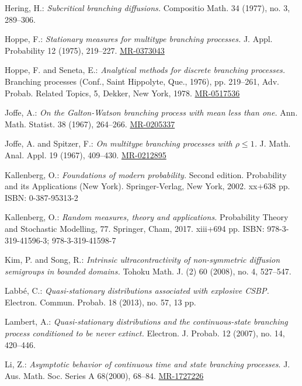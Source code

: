\documentclass[12pt,a4paper]{amsart}
\numberwithin{equation}{section}
\theoremstyle{plain}
\theoremstyle{definition}
\theoremstyle{remark}
\def\MR#1{\href{http://www.ams.org/mathscinet-getitem?mr=#1}{MR-#1}}
\begin{document}
\begin{thebibliography}{99}
	Hering, H.:
	\emph{Subcritical branching diffusions.}
	Compositio Math. 34 (1977), no. 3,
	289--306.
	
	Hoppe, F.:
	\emph{Stationary measures for multitype branching processes.}
	J. Appl. Probability 12 (1975), 219--227.
	\MR{0373043}
	
Hoppe, F. and Seneta, E.:
	\emph{Analytical methods for discrete branching processes.}
	Branching processes (Conf., Saint Hippolyte, Que., 1976), pp. 219--261,
	Adv. Probab. Related Topics, 5, Dekker, New York, 1978.
	\MR{0517536}
	
	Joffe, A.:
	\emph{On the Galton-Watson branching process with mean less than one.}
	Ann. Math. Statist. 38 (1967), 264--266.
	\MR{0205337}
	
Joffe, A. and Spitzer, F.:
	\emph{On multitype branching processes with $\rho \leq 1$.}
	J. Math. Anal. Appl. 19 (1967), 409--430.
	\MR{0212895}
	
	Kallenberg, O.:
	\emph{Foundations of modern probability.}
	Second edition. Probability and its Applications (New York). Springer-Verlag, New York, 2002. xx+638 pp. ISBN: 0-387-95313-2
	
	Kallenberg, O.:
	\emph{Random measures, theory and applications.}
	Probability Theory and Stochastic Modelling, 77. Springer, Cham, 2017. xiii+694 pp. ISBN: 978-3-319-41596-3; 978-3-319-41598-7
	
Kim, P. and Song, R.:
	\emph{Intrinsic ultracontractivity of non-symmetric diffusion semigroups in bounded domains.}
	Tohoku Math. J. (2) 60 (2008), no. 4, 527--547.
	
	Labb\'e, C.:
	\emph{Quasi-stationary distributions associated with explosive CSBP.}
	Electron. Commun. Probab. 18 (2013), no. 57, 13 pp.
	
	Lambert, A.:
	\emph{Quasi-stationary distributions and the continuous-state branching process conditioned to be never extinct.}
	Electron. J. Probab. 12 (2007), no. 14,
	420--446.

	 Li, Z.:
	\emph{Asymptotic behavior of continuous time and state branching processes}.
	J. Aus. Math. Soc. Series A 68(2000), 68--84.
	\MR{1727226}


\end{thebibliography}
\end{document}
